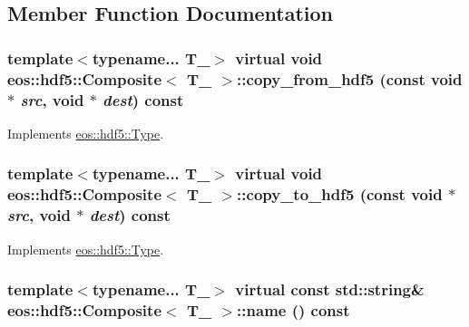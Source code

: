 \subsection{Member Function Documentation}
\hypertarget{classeos_1_1hdf5_1_1Composite_a4504f18af7ad323f89b4635eae9f1695}{
\subsubsection[{copy\_\-from\_\-hdf5}]{\setlength{\rightskip}{0pt plus 5cm}template$<$typename... T\_\-$>$ virtual void {\bf eos::hdf5::Composite}$<$ T\_\- $>$::copy\_\-from\_\-hdf5 (const void $\ast$ {\em src}, \/  void $\ast$ {\em dest}) const}}
\label{classeos_1_1hdf5_1_1Composite_a4504f18af7ad323f89b4635eae9f1695}


Implements \hyperlink{structeos_1_1hdf5_1_1Type_a4d1073336bce1500533e69a1187acd66}{eos::hdf5::Type}.\hypertarget{classeos_1_1hdf5_1_1Composite_ac86859046bcb7b5741afdb5ec13e78f0}{
\subsubsection[{copy\_\-to\_\-hdf5}]{\setlength{\rightskip}{0pt plus 5cm}template$<$typename... T\_\-$>$ virtual void {\bf eos::hdf5::Composite}$<$ T\_\- $>$::copy\_\-to\_\-hdf5 (const void $\ast$ {\em src}, \/  void $\ast$ {\em dest}) const}}
\label{classeos_1_1hdf5_1_1Composite_ac86859046bcb7b5741afdb5ec13e78f0}


Implements \hyperlink{structeos_1_1hdf5_1_1Type_a30b665dc2adbe459feb640c61776b50a}{eos::hdf5::Type}.\hypertarget{classeos_1_1hdf5_1_1Composite_aa72cd90613270fa5006319bee231be5b}{
\subsubsection[{name}]{\setlength{\rightskip}{0pt plus 5cm}template$<$typename... T\_\-$>$ virtual const std::string\& {\bf eos::hdf5::Composite}$<$ T\_\- $>$::name () const}}
\label{classeos_1_1hdf5_1_1Composite_aa72cd90613270fa5006319bee231be5b}


